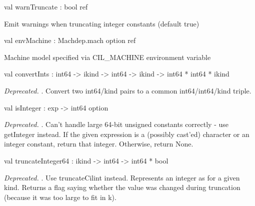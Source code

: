 \documentclass[11pt]{article}
\begin{document}
\label{val:Cil.warnTruncate}\begin{ocamldoccode}
val warnTruncate : bool ref
\end{ocamldoccode}
\begin{ocamldocdescription}
Emit warnings when truncating integer constants (default true)


\end{ocamldocdescription}




\label{val:Cil.envMachine}\begin{ocamldoccode}
val envMachine : Machdep.mach option ref
\end{ocamldoccode}
\begin{ocamldocdescription}
Machine model specified via CIL\_MACHINE environment variable


\end{ocamldocdescription}




\label{val:Cil.convertInts}\begin{ocamldoccode}
val convertInts : int64 -> ikind -> int64 -> ikind -> int64 * int64 * ikind
\end{ocamldoccode}
\begin{ocamldocdescription}
{\it Deprecated. }. Convert two int64/kind pairs to a common int64/int64/kind triple.
\end{ocamldocdescription}




\label{val:Cil.isInteger}\begin{ocamldoccode}
val isInteger : exp -> int64 option
\end{ocamldoccode}
\begin{ocamldocdescription}
{\it Deprecated. }. Can't handle large 64-bit unsigned constants
    correctly - use getInteger instead. If the given expression
    is a (possibly cast'ed) character or an integer constant, return
    that integer.  Otherwise, return None.
\end{ocamldocdescription}




\label{val:Cil.truncateInteger64}\begin{ocamldoccode}
val truncateInteger64 : ikind -> int64 -> int64 * bool
\end{ocamldoccode}
\begin{ocamldocdescription}
{\it Deprecated. }. Use truncateCilint instead. Represents an integer as
 for a given kind.  Returns a flag saying whether the value was
 changed during truncation (because it was too large to fit in k).
\end{ocamldocdescription}
\end{document}
